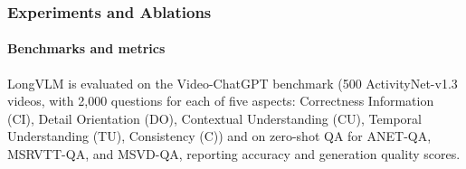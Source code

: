 \begin{enrichment}
\begin{enrichment}
        \subsubsection{Experiments and Ablations}
        \label{enr:subsubsec_chapter24_longvlm_exps}
        
        \paragraph{Benchmarks and metrics}
        LongVLM is evaluated on the Video-ChatGPT benchmark (500 ActivityNet-v1.3 videos, with 2{,}000 questions for each of five aspects: Correctness Information (CI), Detail Orientation (DO), Contextual Understanding (CU), Temporal Understanding (TU), Consistency (C)) and on zero-shot QA for ANET-QA, MSRVTT-QA, and MSVD-QA, reporting accuracy and generation quality scores.
        
        \begin{table}[H]
            \centering
            \caption{Comparison on the Video-ChatGPT benchmark (higher is better). Mean is the average over CI/DO/CU/TU/C. Data sizes follow the original papers. Numbers are from \cite[Tab.~1]{weng2024_longvlm}.}
            \label{tab:chapter24_longvlm_main_vcgpt}
            \footnotesize
            \setlength{\tabcolsep}{4pt}
        \end{table}
        

\end{enrichment}
\end{enrichment}
